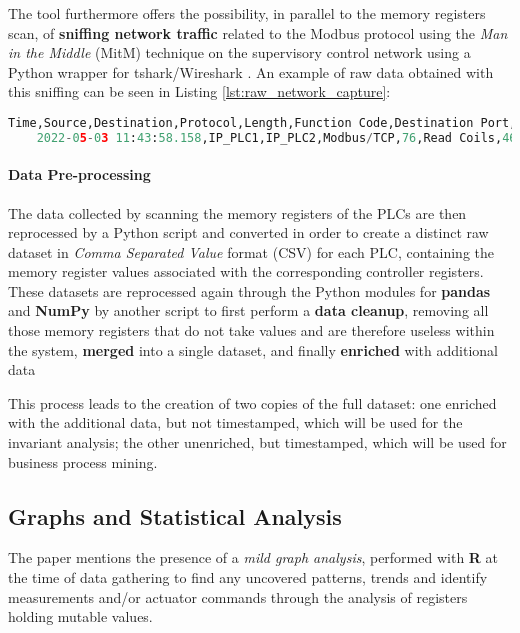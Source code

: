 \bigskip
The tool furthermore offers the possibility, in parallel to the memory registers scan, of \textbf{sniffing network traffic} related to the Modbus protocol using the \textit{Man in the Middle} (MitM) technique on the supervisory control network using a Python wrapper for tshark/Wireshark \cite{tshark} \cite{wireshark}. An example of raw data obtained with this sniffing can be seen in Listing \ref{lst:raw_network_capture}:

\begin{lstlisting}[language=Python, numbers=none, caption=Example of raw network capture, label=lst:raw_network_capture]	
	Time,Source,Destination,Protocol,Length,Function Code,Destination Port,Source Port,Data,Frame length on the wire,Bit Value,Request Frame,Reference Number,Info
	2022-05-03 11:43:58.158,IP_PLC1,IP_PLC2,Modbus/TCP,76,Read Coils,46106,502,,76,TRUE,25,,"Response: Trans: 62; Unit: 1, Func: 1: Read Coils"
\end{lstlisting}

\paragraph{Data Pre-processing} 
The data collected by scanning the memory registers of the PLCs are then reprocessed by a Python script and converted in order to create a distinct raw dataset in \textit{Comma Separated Value} format (CSV) for each PLC, containing the memory register values associated with the corresponding controller registers. These datasets are reprocessed again through the Python modules for \textbf{pandas} \cite{pandas} and \textbf{NumPy} \cite{numpy} by another script to first perform a \textbf{data cleanup}, removing all those memory registers that do not take values and are therefore useless within the system, \textbf{merged} into a single dataset, and finally \textbf{enriched} with additional data %

\bigskip
This process leads to the creation of two copies of the full dataset: one enriched with the additional data, but not timestamped, which will be used for the invariant analysis; the other unenriched, but timestamped, which will be used for business process mining.

\subsection{Graphs and Statistical Analysis}
\label{subsec:ceccato_graphanalysis}
The paper mentions the presence of a \textit{mild graph analysis}, performed with \textbf{R} \cite{r-project} at the time of data gathering to find any uncovered patterns, trends and identify measurements and/or actuator commands through the analysis of registers holding mutable values. 

